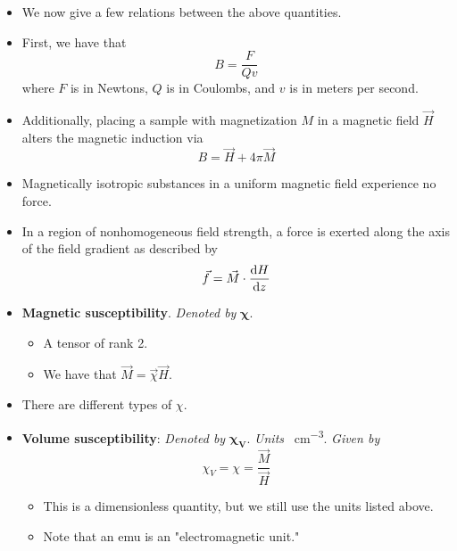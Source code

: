 \documentclass[../notes.tex]{subfiles}
\begin{document}
\begin{itemize}
\begin{itemize}
\begin{itemize}
            \item An MRI is about \SIrange{1.3}{3}{\tesla}.
        \end{itemize}
    \end{itemize}
    \item We now give a few relations between the above quantities.
    \item First, we have that
    \begin{equation*}
        B = \frac{F}{Qv}
    \end{equation*}
    where $F$ is in Newtons, $Q$ is in Coulombs, and $v$ is in meters per second.
    \item Additionally, placing a sample with magnetization $M$ in a magnetic field $\vec{H}$ alters the magnetic induction via
    \begin{equation*}
        B = \vec{H}+4\pi\vec{M}
    \end{equation*}
    \item Magnetically isotropic substances in a uniform magnetic field experience no force.
    \item In a region of nonhomogeneous field strength, a force is exerted along the axis of the field gradient as described by
    \begin{equation*}
        \vec{f} = \vec{M}\cdot\dv{H}{z}
    \end{equation*}
    \item \textbf{Magnetic susceptibility}. \emph{Denoted by} $\bm{\chi}$.
    \begin{itemize}
        \item A tensor of rank 2.
        \item We have that $\vec{M}=\vec{\chi}\vec{H}$.
    \end{itemize}
    \item There are different types of $\chi$.
    \item \textbf{Volume susceptibility}: \emph{Denoted by} $\bm{\chi_V}$. \emph{Units} \si{\electromagneticunit\per\cubic\centi\meter}. \emph{Given by}
    \begin{equation*}
        \chi_V = \chi = \frac{\vec{M}}{\vec{H}}
    \end{equation*}
    \begin{itemize}
        \item This is a dimensionless quantity, but we still use the units listed above.
        \item Note that an emu is an "electromagnetic unit."
    \end{itemize}

\end{itemize}
\end{document}
